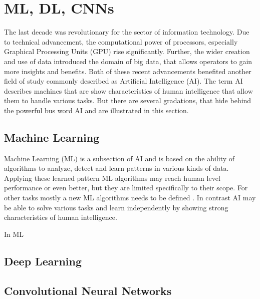 
\section{ML, DL, CNNs}\label{ord:ch2:sec1}

The last decade was revolutionary for the sector of information technology.
Due to technical advancement, the computational power of processors, especially Graphical Processing Units (GPU) rise significantly.
Further, the wider creation and use of data introduced the domain of big data, that allows operators to gain more insights and benefits.
Both of these recent advancements benefited another field of study commonly described as Artificial Intelligence (AI).
The term AI describes machines that are show characteristics of human intelligence that allow them to handle various tasks.
But there are several gradations, that hide behind the powerful bus word AI and are illustrated in this section.

\subsection{Machine Learning}\label{ord:ch2:sec1:subsec1}

Machine Learning (ML) is a subsection of AI and is based on the ability of algorithms to analyze, detect and learn patterns in various kinds of data. 
Applying these learned pattern ML algorithms may reach human level performance or even better, but they are limited specifically to their scope.
For other tasks mostly a new ML algorithms needs to be defined \cite{HR18-AI}.
In contrast AI may be able to solve various tasks and learn independently by showing strong characteristics of human intelligence.

In ML


\subsection{Deep Learning}\label{ord:ch2:sec1:subsec2}
\subsection{Convolutional Neural Networks}\label{ord:ch2:sec1:subsec3}


